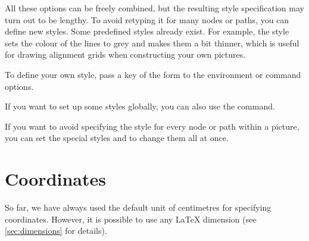 All these options can be freely combined, but the resulting style specification
may turn out to be lengthy. To avoid retyping it for many nodes or paths, you
can define new styles. Some predefined styles already exist. For example, the
 style sets the colour of the lines to grey and makes them a bit
thinner, which is useful for drawing alignment grids when constructing your own
pictures.
\begin{example}
\end{example}
To define your own style, pass a key of the form
 to the \TikZ{} environment or
command options.
\begin{example}[vertical_mode, examplewidth=0.7\linewidth]
\end{example}
If you want to set up some styles globally, you can also use the 
command.
\begin{example}
\end{example}
If you want to avoid specifying the style for every node or path within a
\TikZ{} picture, you can set the special styles  and
 to change them all at once.
\begin{example}
\end{example}

\section{Coordinates}

So far, we have always used the default unit of centimetres for specifying
coordinates. However, it is possible to use any \LaTeX{} dimension (see
\autoref{sec:dimensions} for details).
\begin{example}
\end{example}

